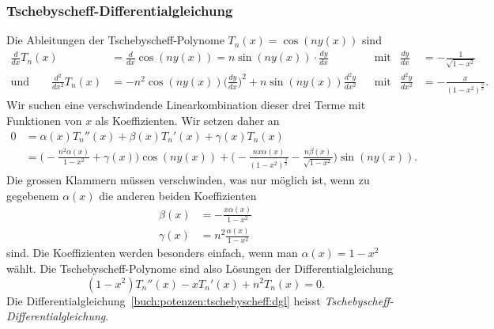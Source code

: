 \subsubsection{Tschebyscheff-Differentialgleichung}
Die Ableitungen der Tschebyscheff-Polynome $T_n(x) = \cos (ny(x))$
sind
\begin{align*}
\frac{d}{dx} T_n(x)
&=
\frac{d}{dx} \cos(ny(x))
=
n\sin(ny(x)) \cdot \frac{dy}{dx}
&
&\text{mit}&
\frac{dy}{dx}
&=
-\frac{1}{\sqrt{1-x^2}}
\\
\text{und}\qquad
\frac{d^2}{dx^2} T_n(x)
&=
-n^2\cos(ny(x)) \biggl(\frac{dy}{dx}\biggr)^2 + n\sin(ny(x)) \frac{d^2y}{dx^2}
&
&\text{mit}&
\frac{d^2y}{dx^2}
&=
-\frac{x}{(1-x^2)^{\frac32}}.
\end{align*}
Wir suchen eine verschwindende Linearkombination dieser drei Terme
mit Funktionen von $x$ als Koeffizienten.
Wir setzen daher an
\begin{align*}
0
&=
\alpha(x) T_n''(x)
+
\beta(x) T_n'(x)
+
\gamma(x) T_n(x)
\\
&=
\biggl(
-\frac{n^2\alpha(x)}{1-x^2}
+
\gamma(x)
\biggr)
\cos(ny(x))
+
\biggl(
-\frac{nx\alpha(x)}{(1-x^2)^{\frac32}}
-\frac{n\beta(x)}{\sqrt{1-x^2}}
\biggr)
\sin(ny(x)).
\end{align*}
Die grossen Klammern müssen verschwinden, was nur möglich ist, wenn zu
gegebenem $\alpha(x)$ die anderen beiden Koeffizienten
\begin{align*}
\beta(x)  &=  -\frac{x\alpha(x)}{1-x^2} \\
\gamma(x) &= n^2 \frac{\alpha(x)}{1-x^2}
\end{align*}
sind.
Die Koeffizienten werden besonders einfach, wenn man $\alpha(x)=1-x^2$ wählt.
Die Tschebyscheff-Polynome sind also Lösungen der Differentialgleichung
\begin{equation}
(1-x^2) T_n''(x) -x T_n'(x) +n^2 T_n(x) = 0.
\label{buch:potenzen:tschebyscheff:dgl}
\end{equation}
Die Differentialgleichung~\eqref{buch:potenzen:tschebyscheff:dgl}
heisst {\em Tschebyscheff-Differentialgleichung}.
%
%




